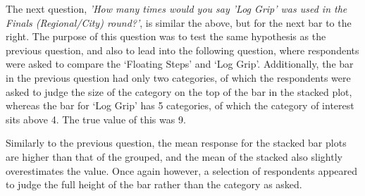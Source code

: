 \documentclass[
]{article}
\newenvironment{Shaded}{\begin{snugshade}}{\end{snugshade}}
\newcommand{\DecValTok}[1]{\textcolor[rgb]{0.00,0.00,0.81}{#1}}
\newcommand{\KeywordTok}[1]{\textcolor[rgb]{0.13,0.29,0.53}{\textbf{#1}}}
\newcommand{\NormalTok}[1]{#1}
\newcommand{\OperatorTok}[1]{\textcolor[rgb]{0.81,0.36,0.00}{\textbf{#1}}}
\newcommand{\StringTok}[1]{\textcolor[rgb]{0.31,0.60,0.02}{#1}}
\begin{document}
The next question,
\textit{'How many times would you say 'Log Grip' was used in the Finals (Regional/City) round?'},
is similar the above, but for the next bar to the right. The purpose of
this question was to test the same hypothesis as the previous question,
and also to lead into the following question, where respondents were
asked to compare the `Floating Steps' and `Log Grip'. Additionally, the
bar in the previous question had only two categories, of which the
respondents were asked to judge the size of the category on the top of
the bar in the stacked plot, whereas the bar for `Log Grip' has 5
categories, of which the category of interest sits above 4. The true
value of this was 9.

\begin{Shaded}
\end{Shaded}

Similarly to the previous question, the mean response for the stacked
bar plots are higher than that of the grouped, and the mean of the
stacked also slightly overestimates the value. Once again however, a
selection of respondents appeared to judge the full height of the bar
rather than the category as asked.
\end{document}
